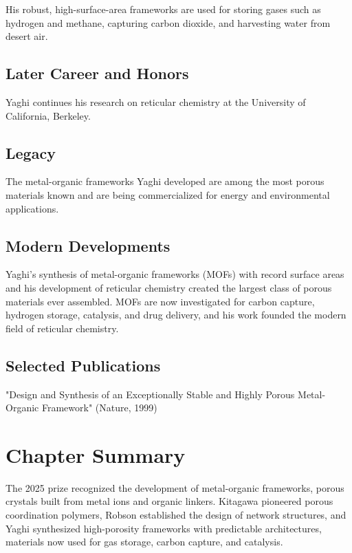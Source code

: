 His robust, high-surface-area frameworks are used for storing gases such as hydrogen and methane, capturing carbon dioxide, and harvesting water from desert air.

\subsection*{Later Career and Honors}

Yaghi continues his research on reticular chemistry at the University of California, Berkeley.

\subsection*{Legacy}

The metal-organic frameworks Yaghi developed are among the most porous materials known and are being commercialized for energy and environmental applications.

\subsection*{Modern Developments}

Yaghi's synthesis of metal-organic frameworks (MOFs) with record surface areas and his development of reticular chemistry created the largest class of porous materials ever assembled. MOFs are now investigated for carbon capture, hydrogen storage, catalysis, and drug delivery, and his work founded the modern field of reticular chemistry.

\subsection*{Selected Publications}

"Design and Synthesis of an Exceptionally Stable and Highly Porous Metal-Organic Framework" (Nature, 1999)

\clearpage

\section*{Chapter Summary}

The 2025 prize recognized the development of metal-organic frameworks, porous crystals built from metal ions and organic linkers. Kitagawa pioneered porous coordination polymers, Robson established the design of network structures, and Yaghi synthesized high-porosity frameworks with predictable architectures, materials now used for gas storage, carbon capture, and catalysis.
